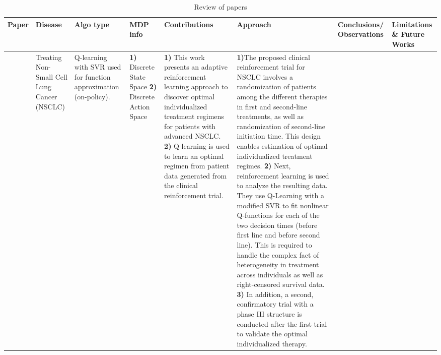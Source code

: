 \begin{table}[!th]
\caption{Review of papers}
\label{tab:review7}
\begin{tabular}{|p{3 em}|p{3 em}|p{3 em}|p{3em}|p{6em}|p{9em}|p{6 em}|p{6em}|}
\toprule
Paper  & Disease  & Algo type & MDP info & Contributions  & Approach & Conclusions/ Observations  & Limitations \& Future Works \\
\hline
\citet{zhao2011reinforcement} & Treating Non-Small Cell Lung Cancer (NSCLC)
& 
Q-learning with SVR used for function approximation (on-policy).
& 
\textbf{1)} Discrete State Space 
\textbf{2)} Discrete Action Space 
&  
\textbf{1)} This work presents an adaptive reinforcement learning approach to discover optimal individualized treatment
regimens for patients with advanced NSCLC. \textbf{2)} Q-learning is used to learn an optimal regimen from patient data generated from the clinical reinforcement trial.
&
\textbf{1)}The proposed clinical reinforcement trial for NSCLC involves a randomization of patients among the different therapies in first and second-line treatments, as well as randomization of second-line initiation time. This design enables estimation of optimal individualized treatment regimes. \textbf{2)} Next, reinforcement learning is used to analyze the resulting data. They use Q-Learning with a modified SVR \citep{DBLP:conf/nips/VapnikGS96} to fit nonlinear Q-functions for each of the two decision times (before first line and before second line). This is required to handle the complex fact of heterogeneity in treatment across individuals as well as right-censored survival data. \textbf{3)} In addition, a second, confirmatory trial with a phase III structure is conducted after the first trial to validate the optimal individualized therapy.

\end{tabular}
\end{table}
